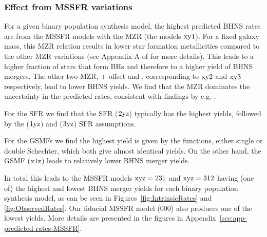 \documentclass[twocolumn]{aastex63}
\newcommand\bhnsSingle{BHNS\xspace}
\begin{document}
\subsubsection{Effect from \ac{MSSFR} variations  }
\label{subsec:effect-from-MSSFR-variations}

For a given binary population synthesis model, the highest predicted \bhnsSingle rates are from the \ac{MSSFR} models with the  \citet{2006ApJ...638L..63L}   \ac{MZR} (the models $\rm{xy}1$). For a fixed galaxy mass, this   \ac{MZR} relation results in lower star formation metallicities compared to the other \ac{MZR}  variations (see Appendix A of  \citealt{2019MNRAS.490.3740N} for more details). 
This leads to a higher fraction  of stars that form \acp{BH} and therefore to a higher yield of \bhnsSingle mergers. 
The other two MZR,    \citet{2006ApJ...638L..63L} $+$ offset and \citet{2016MNRAS.456.2140M}, corresponding to $\rm{xy}2$ and $\rm{xy}3$ respectively,   lead to lower \bhnsSingle  yields.  
We find that the \ac{MZR} dominates the uncertainty in the predicted rates, consistent with findings by e.g.  \citet{2019MNRAS.487.1675A, 2019MNRAS.488.5300C}.

For the \ac{SFR}  we find that the  \citet{2004ApJ...613..200S} \ac{SFR}  ($2\rm{yz}$)  typically has the highest yields, followed by the {\citet{2014ARA&A..52..415M}}  ($1\rm{yz}$) and  \citet{2017ApJ...840...39M}  ($3\rm{yz}$) \ac{SFR}  assumptions. 

For the GSMFs we find the highest yield is given by the  \citet{2015MNRAS.450.4486F} functions, either single or double Schechter,  which both give almost identical yields. 
On the other hand, the \citet{2004MNRAS.355..764P}  \ac{GSMF}  ($\rm{x}1\rm{z}$) leads to  relatively lower \bhnsSingle merger  yields. 

In total this leads to the \ac{MSSFR} models   $\rm{xyz}=231$ and $\rm{xyz}=312$  having (one of)  the highest and lowest \bhnsSingle merger yields for each binary population synthesis model,    as can be seen in Figures~\ref{fig:IntrinsicRates} and \ref{fig:ObservedRates}. Our fiducial \ac{MSSFR} model (000) also produces one of the lowest yields.   More details are presented in the figures in Appendix~\ref{sec:app-predicted-rates-MSSFR}.
\end{document}
